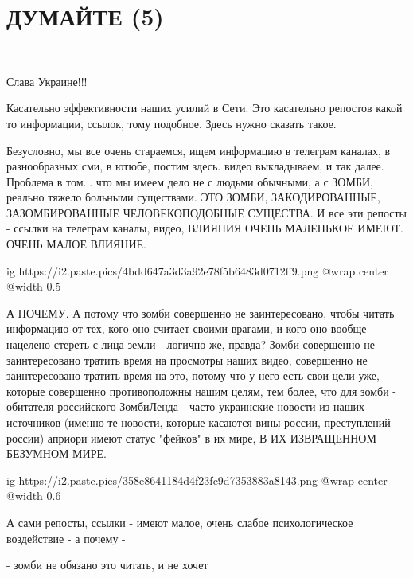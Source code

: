  
 
 
 
 

\section{ДУМАЙТЕ (5)}

💛 💙 💛 💙 💛 💙 💛 💙 💛 💙 💛 💙            

Слава Украине!!! 

Касательно эффективности наших усилий в Сети. Это касательно репостов какой то
информации, ссылок, тому подобное. Здесь нужно сказать такое.

Безусловно, мы все очень стараемся, ищем информацию в телеграм каналах, в
разнообразных сми, в ютюбе, постим здесь. видео выкладываем, и так далее.
Проблема в том...  что мы имеем дело не с людьми обычными, а с ЗОМБИ, реально
тяжело больными существами. ЭТО ЗОМБИ, ЗАКОДИРОВАННЫЕ, ЗАЗОМБИРОВАННЫЕ
ЧЕЛОВЕКОПОДОБНЫЕ СУЩЕСТВА. И все эти репосты - ссылки на телеграм каналы,
видео, ВЛИЯНИЯ ОЧЕНЬ МАЛЕНЬКОЕ ИМЕЮТ. ОЧЕНЬ МАЛОЕ ВЛИЯНИЕ.

\ifcmt
  ig https://i2.paste.pics/4bdd647a3d3a92e78f5b6483d0712ff9.png
  @wrap center
  @width 0.5
\fi

А ПОЧЕМУ. А потому что зомби совершенно не заинтересовано, чтобы читать
информацию от тех, кого оно считает своими врагами, и кого оно вообще нацелено
стереть с лица земли - логично же, правда? Зомби совершенно не заинтересовано
тратить время на просмотры наших видео, совершенно не заинтересовано тратить
время на это, потому что у него есть свои цели уже, которые совершенно
противоположны нашим целям, тем более, что для зомби - обитателя российского
ЗомбиЛенда - часто украинские новости из наших источников (именно те новости,
которые касаются вины россии, преступлений россии) априори имеют статус
"фейков" в их мире, В ИХ ИЗВРАЩЕННОМ БЕЗУМНОМ МИРЕ. 

\ifcmt
  ig https://i2.paste.pics/358e8641184d4f23fc9d7353883a8143.png
  @wrap center
  @width 0.6
\fi

А сами репосты, ссылки - имеют малое, очень слабое психологическое воздействие
- а почему - 

- зомби не обязано это читать, и не хочет

